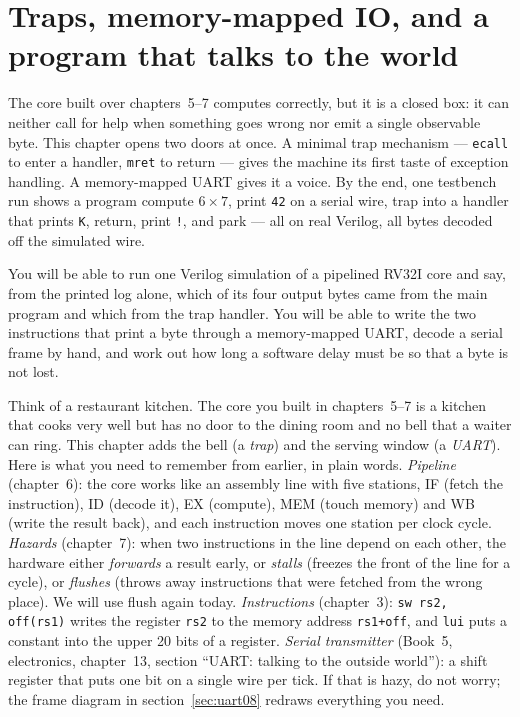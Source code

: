 \chapter{Traps, memory-mapped IO, and a program that talks to the world}
\label{ch:systems08}

The core built over chapters~5--7 computes correctly, but it is a
closed box: it can neither call for help when something goes wrong
nor emit a single observable byte. This chapter opens two doors at
once. A minimal trap mechanism --- \texttt{ecall} to enter a handler,
\texttt{mret} to return --- gives the machine its first taste of
exception handling. A memory-mapped UART gives it a voice. By the
end, one testbench run shows a program compute \(6\times 7\), print
\texttt{42} on a serial wire, trap into a handler that prints
\texttt{K}, return, print \texttt{!}, and park --- all on real
Verilog, all bytes decoded off the simulated wire.

\begin{rulebox}
You will be able to run one Verilog simulation of a pipelined RV32I
core and say, from the printed log alone, which of its four output
bytes came from the main program and which from the trap handler. You
will be able to write the two instructions that print a byte through a
memory-mapped UART, decode a serial frame by hand, and work out how
long a software delay must be so that a byte is not lost.
\end{rulebox}

\begin{rulebox}
Think of a restaurant kitchen. The core you built in chapters~5--7 is a
kitchen that cooks very well but has no door to the dining room and no
bell that a waiter can ring. This chapter adds the bell (a \emph{trap})
and the serving window (a \emph{UART}). Here is what you need to
remember from earlier, in plain words.
\emph{Pipeline} (chapter~6): the core works like an assembly line with
five stations, IF (fetch the instruction), ID (decode it), EX (compute),
MEM (touch memory) and WB (write the result back), and each instruction
moves one station per clock cycle.
\emph{Hazards} (chapter~7): when two instructions in the line depend on
each other, the hardware either \emph{forwards} a result early, or
\emph{stalls} (freezes the front of the line for a cycle), or
\emph{flushes} (throws away instructions that were fetched from the
wrong place). We will use flush again today.
\emph{Instructions} (chapter~3): \texttt{sw rs2, off(rs1)} writes the
register \texttt{rs2} to the memory address \texttt{rs1+off}, and
\texttt{lui} puts a constant into the upper 20 bits of a register.
\emph{Serial transmitter} (Book~5, electronics, chapter~13, section
``UART: talking to the outside world''): a shift register that puts one
bit on a single wire per tick. If that is hazy, do not worry; the frame
diagram in section~\ref{sec:uart08} redraws everything you need.
\end{rulebox}

